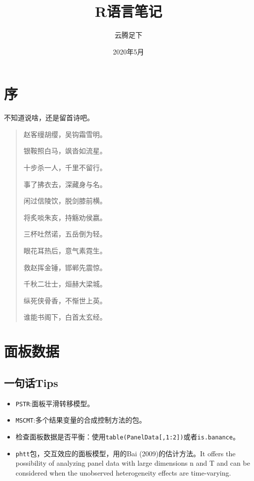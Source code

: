 \documentclass[
]{book}
\title{R语言笔记}
\author{云腾足下}
\date{2020年5月}
\providecommand{\tightlist}{%
  \setlength{\itemsep}{0pt}\setlength{\parskip}{0pt}}
\begin{document}
\maketitle

{
\setcounter{tocdepth}{1}
\tableofcontents
}
\hypertarget{ux5e8f}{%
\chapter*{序}\label{ux5e8f}}

不知道说啥，还是留首诗吧。

\begin{quote}
赵客缦胡缨，吴钩霜雪明。

银鞍照白马，飒沓如流星。

十步杀一人，千里不留行。

事了拂衣去，深藏身与名。

闲过信陵饮，脱剑膝前横。

将炙啖朱亥，持觞劝侯嬴。

三杯吐然诺，五岳倒为轻。

眼花耳热后，意气素霓生。

救赵挥金锤，邯郸先震惊。

千秋二壮士，烜赫大梁城。

纵死侠骨香，不惭世上英。

谁能书阁下，白首太玄经。
\end{quote}

\hypertarget{PanelData}{%
\chapter{面板数据}\label{PanelData}}

\hypertarget{ux4e00ux53e5ux8bddtips}{%
\section{一句话Tips}\label{ux4e00ux53e5ux8bddtips}}

\begin{itemize}
\tightlist
\item
  \texttt{PSTR}:面板平滑转移模型。
\item
  \texttt{MSCMT}:多个结果变量的合成控制方法的包。
\item
  检查面板数据是否平衡：使用\texttt{table(PanelData{[},1:2{]})}或者\texttt{is.banance}。
\item
  \texttt{phtt}包，交互效应的面板模型，用的Bai (2009)的估计方法。It offers the possibility of analyzing panel data with large dimensions n and T and can be considered when the unobserved heterogeneity effects are time-varying.
\end{itemize}
\end{document}
